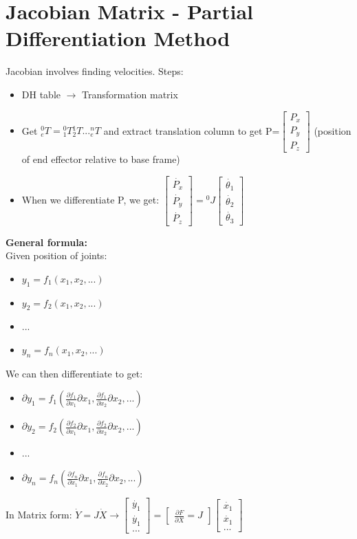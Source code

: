 \documentclass{article}
\begin{document}
\section{Jacobian Matrix - Partial Differentiation Method}
Jacobian involves finding velocities. Steps:
\begin{itemize}
    \item DH table $\rightarrow$ Transformation matrix
    \item Get ${}^0_eT={}^0_1T {}^1_2T ... {}^n_eT$ and extract translation column to get P=$\begin{bmatrix}
        P_x\\
        P_y\\
        P_z
    \end{bmatrix}$ (position of end effector relative to base frame)
    \item When we differentiate P, we get: $\begin{bmatrix}
        \dot{P_x}\\
        \dot{P_y}\\
        \dot{P_z}
    \end{bmatrix}= {}^0J \begin{bmatrix}
        \dot{\theta_1} \\
        \dot{\theta_2} \\
        \dot{\theta_3}
    \end{bmatrix}$
\end{itemize}
\textbf{General formula:}\\
Given position of joints:
\begin{itemize}
    \item $y_1=f_1(x_1,x_2,...)$
    \item $y_2=f_2(x_1,x_2,...)$
    \item ...
    \item $y_n=f_n(x_1,x_2,...)$
\end{itemize}
We can then differentiate to get:
\begin{itemize}
    \item $\partial y_1=f_1(\frac{\partial f_1}{\partial x_1}\partial x_1,\frac{\partial f_1}{\partial x_2}\partial x_2,...)$
    \item $\partial y_2=f_2(\frac{\partial f_2}{\partial x_1}\partial x_1,\frac{\partial f_2}{\partial x_2}\partial x_2,...)$
    \item ...
    \item $\partial y_n=f_n(\frac{\partial f_n}{\partial x_1}\partial x_1,\frac{\partial f_n}{\partial x_2}\partial x_2,...)$
\end{itemize}
In Matrix form:
$\dot{Y}=J\dot{X} \rightarrow \begin{bmatrix}
    \dot{y_1}\\
    \dot{y_1}\\
    ...
\end{bmatrix}=
\begin{bmatrix}
    \frac{\partial F}{\partial X} = J 
\end{bmatrix}\begin{bmatrix}
    \dot{x_1}\\
    \dot{x_1}\\
    ...
\end{bmatrix}$
\end{document}
